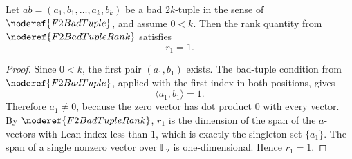 \begin{helper}
Let \(ab=(a_1,b_1,\ldots,a_k,b_k)\) be a bad \(2k\)-tuple in the sense of
\(\noderef{F2BadTuple}\), and assume \(0<k\). Then the rank quantity from
\(\noderef{F2BadTupleRank}\) satisfies
\[
  r_1=1.
\]
\end{helper}
\begin{proof}
Since \(0<k\), the first pair \((a_1,b_1)\) exists. The bad-tuple condition from
\(\noderef{F2BadTuple}\), applied with the first index in both positions, gives
\[
  \langle a_1,b_1\rangle=1.
\]
Therefore \(a_1\ne0\), because the zero vector has dot product \(0\) with every
vector. By \(\noderef{F2BadTupleRank}\), \(r_1\) is the dimension of the span of
the \(a\)-vectors with Lean index less than \(1\), which is exactly the singleton
set \(\{a_1\}\). The span of a single nonzero vector over \(\mathbb F_2\) is
one-dimensional. Hence \(r_1=1\).
\end{proof}

